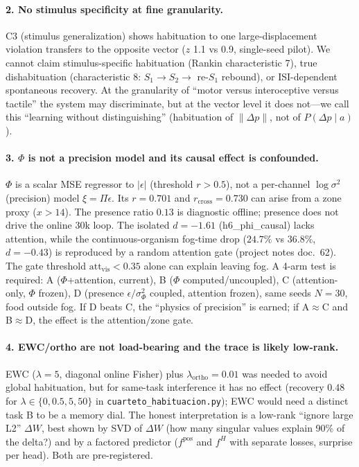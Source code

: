 \documentclass[11pt,a4paper]{article}
\begin{document}
\paragraph{2. No stimulus specificity at fine granularity.} C3 (stimulus generalization) shows habituation to one large-displacement violation transfers to the opposite vector ($z$ 1.1 vs 0.9, single-seed pilot). We cannot claim stimulus-specific habituation (Rankin characteristic 7), true dishabituation (characteristic 8: $S_1\rightarrow S_2\rightarrow$ re-$S_1$ rebound), or ISI-dependent spontaneous recovery. At the granularity of ``motor versus interoceptive versus tactile'' the system may discriminate, but at the vector level it does not---we call this ``learning without distinguishing'' (habituation of $\|\Delta p\|$, not of $P(\Delta p\mid a)$).

\paragraph{3. $\Phi$ is not a precision model and its causal effect is confounded.} $\Phi$ is a scalar MSE regressor to $|\epsilon|$ (threshold $r>0.5$), not a per-channel $\log \sigma^2$ (precision) model $\xi=\Pi\epsilon$. Its $r=0.701$ and $r_{\mathrm{cross}}=0.730$ can arise from a zone proxy ($x>14$). The presence ratio $0.13$ is diagnostic offline; presence does not drive the online 30k loop. The isolated $d=-1.61$ (h6\_phi\_causal) lacks attention, while the continuous-organism fog-time drop ($24.7\%$ vs $36.8\%$, $d=-0.43$) is reproduced by a random attention gate (project notes doc.~62). The gate threshold $\mathrm{att}_{\mathrm{vis}}<0.35$ alone can explain leaving fog. A 4-arm test is required: A ($\Phi$+attention, current), B ($\Phi$ computed/uncoupled), C (attention-only, $\Phi$ frozen), D (presence $\epsilon/\sigma_\Phi^2$ coupled, attention frozen), same seeds $N=30$, food outside fog. If D beats C, the ``physics of precision'' is earned; if A$\approx$C and B$\approx$D, the effect is the attention/zone gate.

\paragraph{4. EWC/ortho are not load-bearing and the trace is likely low-rank.} EWC ($\lambda=5$, diagonal online Fisher) plus $\lambda_{\mathrm{ortho}}=0.01$ was needed to avoid global habituation, but for same-task interference it has no effect (recovery $0.48$ for $\lambda\in\{0,0.5,5,50\}$ in \texttt{cuarteto\_habituacion.py}); EWC would need a distinct task B to be a memory dial. The honest interpretation is a low-rank ``ignore large L2'' $\Delta W$, best shown by SVD of $\Delta W$ (how many singular values explain 90\% of the delta?) and by a factored predictor ($f^{\mathrm{pos}}$ and $f^{H}$ with separate losses, surprise per head). Both are pre-registered.
\end{document}
